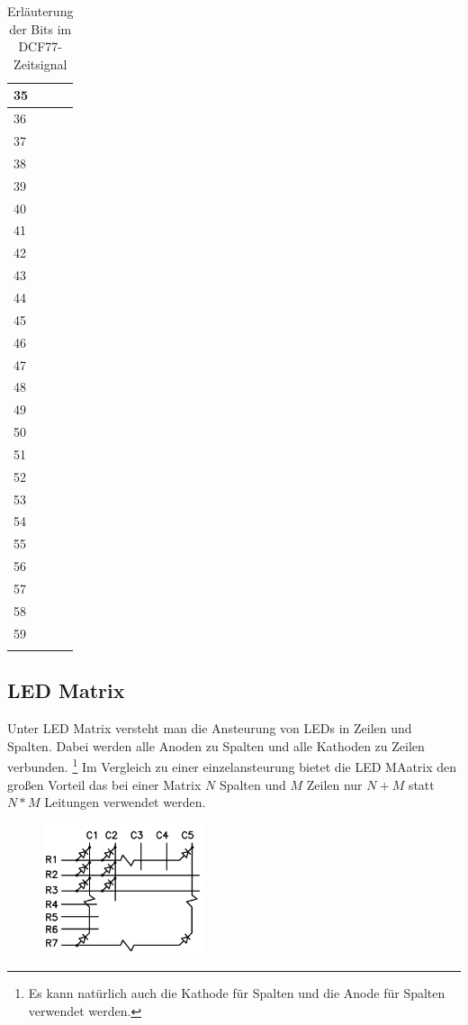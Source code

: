 \begin{longtable}{|l|l|}
35 & \\\hline
36 & \\\hline
37 & \\\hline
38 & \\\hline
39 & \\\hline
40 & \\\hline
41 & \\\hline
42 & \\\hline
43 & \\\hline
44 & \\\hline
45 & \\\hline
46 & \\\hline
47 & \\\hline
48 & \\\hline
49 & \\\hline
50 & \\\hline
51 & \\\hline
52 & \\\hline
53 & \\\hline
54 & \\\hline
55 & \\\hline
56 & \\\hline
57 & \\\hline
58 & \\\hline
59 & \\\hline
\caption{Erläuterung der Bits im DCF77-Zeitsignal}\label{tbl_dcf77kod}
\end{longtable}
%
\subsection{LED Matrix}
Unter LED Matrix versteht man die Ansteurung von LEDs in Zeilen und Spalten. Dabei werden alle Anoden zu Spalten und alle Kathoden zu Zeilen
verbunden. \footnote{Es kann natürlich auch die Kathode für Spalten und die
Anode für Spalten verwendet werden.} Im Vergleich zu einer einzelansteurung
bietet die LED MAatrix den großen Vorteil das bei einer Matrix $N$ Spalten
und $M$ Zeilen nur $N+M$ statt $N*M$ Leitungen verwendet werden.

\begin{figure}
  \vspace{-25pt}
  \begin{center}
    \includegraphics[width=0.42\textwidth]{skizzen/led_matrix_5x7.png}
  \end{center}
  \vspace{-20pt}
\end{figure}

